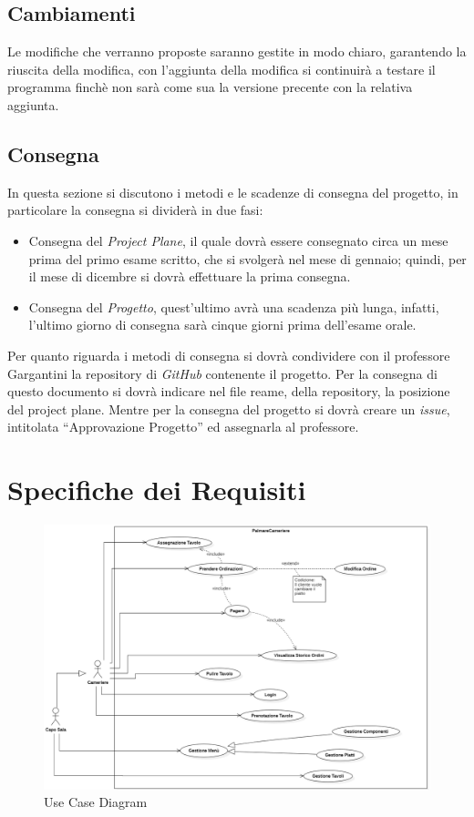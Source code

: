\documentclass{book}
\begin{document}
\section{Cambiamenti}

Le modifiche che verranno proposte saranno gestite in modo chiaro, garantendo la riuscita della modifica, con l'aggiunta della modifica si continuirà a testare il programma finchè non sarà come sua la versione precente con la relativa aggiunta. 


\section{Consegna}


In questa sezione si discutono i metodi e le scadenze di consegna del progetto, in particolare la consegna si dividerà in due fasi:


\begin{itemize}
    \item Consegna del \textit{Project Plane}, il quale dovrà essere consegnato circa un mese prima del primo esame scritto, che si svolgerà nel mese di gennaio; quindi, per il mese di dicembre si dovrà effettuare la prima consegna.
    \item Consegna del \textit{Progetto}, quest'ultimo avrà una scadenza più lunga, infatti, l'ultimo giorno di consegna sarà cinque giorni prima dell'esame orale.
\end{itemize}
Per quanto riguarda i metodi di consegna si dovrà condividere con il professore Gargantini la repository di \textit{GitHub} contenente il progetto. Per la consegna di questo documento si dovrà indicare nel file reame, della repository, la posizione del project plane. Mentre per la consegna del progetto si dovrà creare un \textit{issue}, intitolata “Approvazione Progetto” ed assegnarla al professore.

\chapter{Specifiche dei Requisiti}

\begin{figure}[ht]
    \centering
    \includegraphics[width=1\linewidth]{../../UML/Diagrammi/Use_Case_Diagram.png}
    \caption{Use Case Diagram}
    \label{fig: use_case_diagram}
\end{figure}
\end{document}
